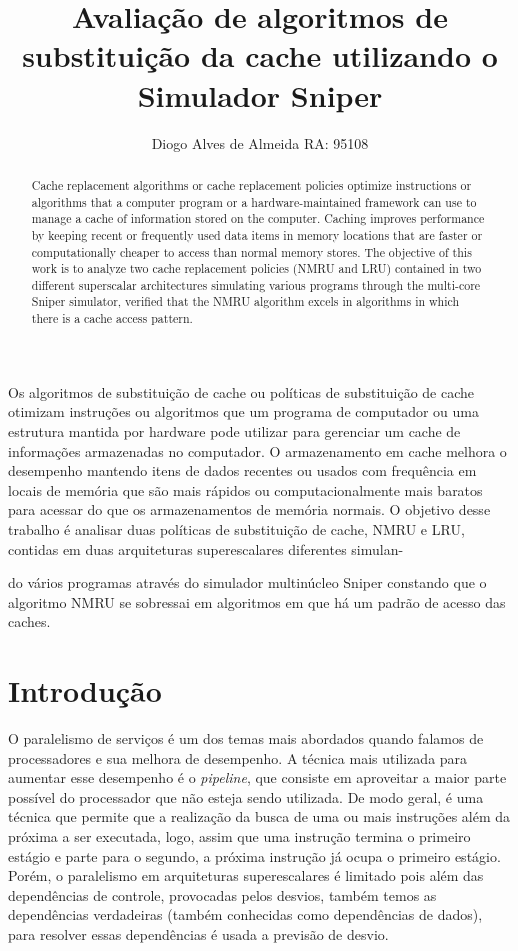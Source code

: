 \documentclass[12pt]{article}
\title{Avaliação de algoritmos de substituição da cache utilizando o Simulador Sniper}
\author{Diogo Alves de Almeida RA: 95108\inst{1}}
\begin{document}
 

\maketitle

\begin{resumo}
Os algoritmos de substituição de cache ou políticas de substituição de cache otimizam instruções ou algoritmos que um programa de computador ou uma estrutura mantida por hardware pode utilizar para gerenciar um cache de informações armazenadas no computador. O armazenamento em cache melhora o desempenho mantendo itens de dados recentes ou usados com frequência em locais de memória que são mais rápidos ou computacionalmente mais baratos para acessar do que os armazenamentos de memória normais. O objetivo desse trabalho é analisar duas políticas de substituição de cache, NMRU e LRU, contidas em duas arquiteturas superescalares diferentes simulan-

do vários programas através do simulador multinúcleo Sniper constando que o algoritmo NMRU se sobressai em algoritmos em que há um padrão de acesso das caches.
\end{resumo}

\begin{abstract}
Cache replacement algorithms or cache replacement policies optimize instructions or algorithms that a computer program or a hardware-maintained framework can use to manage a cache of information stored on the computer. Caching improves performance by keeping recent or frequently used data items in memory locations that are faster or computationally cheaper to access than normal memory stores. The objective of this work is to analyze two cache replacement policies (NMRU and LRU) contained in two different superscalar architectures simulating various programs through the multi-core Sniper simulator, verified that the NMRU algorithm excels in algorithms in which there is a cache access pattern.
\end{abstract}

\section{Introdução}
O paralelismo de serviços é um dos temas mais abordados quando falamos de processadores e sua melhora de desempenho. A técnica mais utilizada para aumentar esse desempenho é o \textit{pipeline}, que consiste em aproveitar a maior parte possível do processador que não esteja sendo utilizada. De modo geral, é uma técnica que permite que a realização da busca de uma ou mais instruções além da próxima a ser executada, logo, assim que uma instrução termina o primeiro estágio e parte para o segundo, a próxima instrução já ocupa o primeiro estágio. Porém, o paralelismo em arquiteturas superescalares é limitado pois além das dependências de controle, provocadas pelos desvios, também temos as dependências verdadeiras (também conhecidas como dependências de dados), para resolver essas dependências é usada a previsão de desvio.
\end{document}
